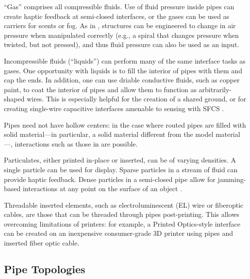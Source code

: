 ``Gas'' comprises all compressible fluids.  Use of fluid pressure inside pipes can create haptic feedback at semi-closed interfaces, or the gases can be used as carriers for scents or fog.  As in \cite{Slyper-pressure}, structures can be engineered to change in air pressure when manipulated correctly (e.g., a spiral that changes pressure when twisted, but not pressed), and thus fluid pressure can also be used as an input. 

Incompressible fluids (``liquids'') can perform many of the same interface tasks as gases.  One opportunity with liquids is to fill the interior of pipes with them and cap the ends.  In addition, one can use driable conductive fluids, such as copper paint, to coat the interior of pipes and allow them to function as arbitrarily-shaped wires.  This is especially helpful for the creation of a shared ground, or for creating single-wire capacitive interfaces amenable to sensing with SFCS \cite{Sato-touche}.

Pipes need not have hollow centers: in the case where routed pipes are filled with solid material---in particular, a solid material different from the model material---, interactions such as those in \cite{Willis-printedoptics} are possible.

Particulates, either printed in-place or inserted, can be of varying densities.  A single particle can be used for display.  Sparse particles in a stream of fluid can provide haptic feedback.  Dense particles in a semi-closed pipe allow for jamming-based interactions at any point on the surface of an object \cite{Follmer-jamming}.

Threadable inserted elements, such as electroluminescent (EL) wire or fiberoptic cables, are those that can be threaded through pipes post-printing.  This allows overcoming limitations of printers: for example, a Printed Optics-style interface can be created on an inexpensive consumer-grade 3D printer using pipes and inserted fiber optic cable.

\subsection{Pipe Topologies}

